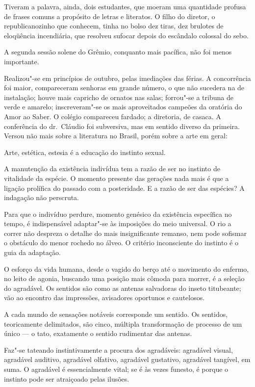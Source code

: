 Tiveram a palavra, ainda, dois
estudantes, que moeram uma quantidade profusa de frases comuns a 
propósito de letras e literatos. O filho do diretor, o republicanozinho
que conhecem, tinha no bolso dez tiras, dez brulotes de eloqüência
incendiária, que resolveu sufocar depois do escândalo colossal do sebo.

A segunda sessão solene do Grêmio, conquanto mais pacífica, não foi
menos importante. 

Realizou"-se em princípios de outubro, pelas
imediações das férias. A concorrência foi maior, compareceram senhoras
em grande número, o que não sucedera na de instalação; houve mais
capricho de ornatos nas salas; forrou"-se a tribuna de verde e
amarelo; inscreveram"-se os mais aproveitados campeões da oratória do
Amor ao Saber. O colégio compareceu fardado; a diretoria, de casaca. A
conferência do dr.~Cláudio foi subversiva, mas em sentido diverso da
primeira. Versou não mais sobre a literatura no Brasil, porém sobre a
arte em geral:

\noindent\dotfill

Arte, estética, estesia é a educação do instinto sexual. 

A manutenção
da existência indivídua tem a razão de ser no instinto de vitalidade da
espécie. O momento presente das gerações nada mais é que a ligação
prolífica do passado com a posteridade. E a razão de ser das espécies?
A indagação não perscruta. 

Para que o indivíduo perdure, momento
genésico da existência específica no tempo, é indispensável
adaptar"-se às imposições do meio universal. O rio a correr não
despreza o detalhe do mais insignificante remanso, nem pode sofismar o
obstáculo do menor rochedo no álveo. O critério inconsciente do
instinto é o guia da adaptação. 

O esforço da vida humana, desde o
vagido do berço até o movimento do enfermo, no leito de agonia,
buscando uma posição mais cômoda para morrer, é a seleção do agradável.
Os sentidos são como as antenas salvadoras do inseto titubeante; vão ao
encontro das impressões, avisadores oportunos e cautelosos. 

A cada
mundo de sensações notáveis corresponde um sentido. Os sentidos,
teoricamente delimitados, são cinco, múltipla transformação de processo
de um único --- o tato, exatamente o sentido rudimentar das antenas.

Faz"-se tateando instintivamente a procura dos agradáveis: agradável
visual, agradável auditivo, agradável olfativo, agradável gustativo,
agradável tangível, em suma. O agradável é essencialmente vital; se é
às vezes funesto, é porque o instinto pode ser atraiçoado pelas
ilusões. 

